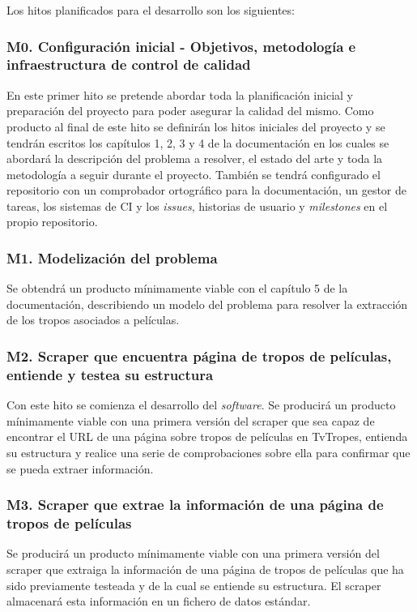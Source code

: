 Los hitos planificados para el desarrollo son los siguientes:

\subsubsection{M0. Configuración inicial - Objetivos, metodología e infraestructura de control de calidad}
En este primer hito se pretende abordar toda la planificación inicial y preparación del proyecto para poder asegurar la calidad del mismo. Como producto al final de este hito se definirán los hitos iniciales del proyecto y se tendrán escritos los capítulos 1, 2, 3 y 4 de la documentación en los cuales se abordará la descripción del problema a resolver, el estado del arte y toda la metodología a seguir durante el proyecto. También se tendrá configurado el repositorio con un comprobador ortográfico para la documentación, un gestor de tareas, los sistemas de CI y los \textit{issues}, historias de usuario y \textit{milestones} en el propio repositorio.

\subsubsection{M1. Modelización del problema}
Se obtendrá un producto mínimamente viable con el capítulo 5 de la documentación, describiendo un modelo del problema para resolver la extracción de los tropos asociados a películas.


\subsubsection{M2. Scraper que encuentra página de tropos de películas, entiende y testea su estructura}
Con este hito se comienza el desarrollo del \textit{software}. Se producirá un producto mínimamente viable con una primera versión del scraper que sea capaz de encontrar el URL de una página sobre tropos de películas en TvTropes, entienda su estructura y realice una serie de comprobaciones sobre ella para confirmar que se pueda extraer información.

\subsubsection{M3. Scraper que extrae la información de una página de tropos de películas}
Se producirá un producto mínimamente viable con una primera versión del scraper que extraiga la información de una página de tropos de películas que ha sido previamente testeada y de la cual se entiende su estructura. El scraper almacenará esta información en un fichero de datos estándar.

